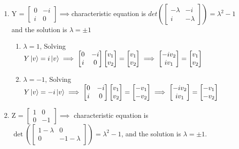 \documentclass{article}
\begin{document}
\begin{framed}
\begin{enumerate}
\begin{enumerate}
        \end{enumerate}
        \item Y = $\begin{bmatrix} 0 & -i \\ i & 0 \end{bmatrix} \implies $characteristic equation is $det(\begin{bmatrix} - \lambda & -i \\ i & -\lambda \end{bmatrix}) = \lambda^2 - 1$ and the solution is $\lambda = \pm 1$
        \begin{enumerate}
            \item $\lambda = 1$, Solving $Y\ket{v} = i\ket{v} \implies \begin{bmatrix}0 & -i \\ i & 0\end{bmatrix}\begin{bmatrix}v_1 \\ v_2\end{bmatrix} = \begin{bmatrix}v_1 \\ v_2\end{bmatrix} \implies \begin{bmatrix}-iv_2 \\ iv_1\end{bmatrix} = \begin{bmatrix}v_1 \\ v_2\end{bmatrix}$
            \item $\lambda = -1$, Solving $Y\ket{v} = -i\ket{v} \implies \begin{bmatrix}0 & -i \\ i & 0\end{bmatrix}\begin{bmatrix}v_1 \\ v_2\end{bmatrix} = \begin{bmatrix}-v_1 \\ -v_2\end{bmatrix} \implies  \begin{bmatrix}-iv_2 \\ iv_1\end{bmatrix}= \begin{bmatrix}-v_1 \\ -v_2\end{bmatrix}$
        \end{enumerate}
        \item Z = $\begin{bmatrix} 1 & 0 \\ 0 & -1 \end{bmatrix} \implies$ characteristic equation is $\det(\begin{bmatrix} 1 - \lambda & 0 \\ 0 & -1 - \lambda \end{bmatrix}) = \lambda^2 - 1$, and the solution is $\lambda = \pm1$.

\end{enumerate}
\end{framed}
\end{document}
